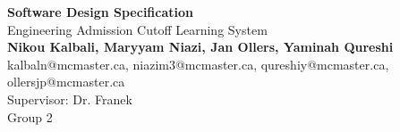 \documentclass{article}
\begin{document}
	\begin{center}
        \topskip 0pt
        \vspace*{\fill}
    		\LARGE{\textbf{Software Design Specification}} \\
            \vspace{1em}
            \Large{Engineering Admission Cutoff Learning System} \\
            \vspace{1em}
            \normalsize\textbf{Nikou Kalbali, Maryyam Niazi, Jan Ollers, Yaminah Qureshi} \\
            \normalsize{kalbaln@mcmaster.ca, niazim3@mcmaster.ca, qureshiy@mcmaster.ca, ollersjp@mcmaster.ca} \\
            \vspace{1em}
            \normalsize{Supervisor: Dr. Franek} \\
            \vspace{1em}
            \normalsize{Group 2} \\
    \vspace*{\fill}
	\end{center}
	
\end{document}
